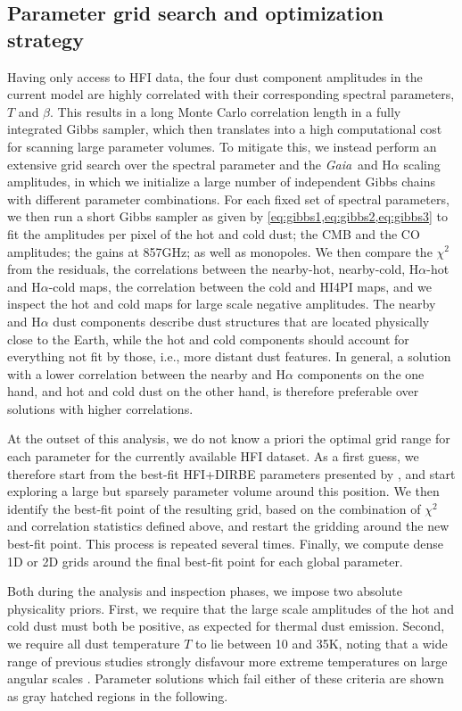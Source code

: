 \documentclass{aa}
\def\Gaia{\textit{Gaia}}
\def\Ha{H$\alpha$}
\def\,{\thinspace}
\begin{document}
\subsection{Parameter grid search and optimization strategy}
\label{sec:statistics}
Having only access to HFI data, the four dust component amplitudes in the current model are highly correlated with their corresponding spectral parameters, $T$ and $\beta$. This results in a long Monte Carlo correlation length in a fully integrated Gibbs sampler, which then translates into a high computational cost for scanning large parameter volumes. To mitigate this, we instead perform an extensive grid search over the spectral parameter and the \Gaia\ and H$\alpha$ scaling amplitudes, in which we initialize a large number of independent Gibbs chains with different parameter combinations. For each fixed set of spectral parameters, we then run a short Gibbs sampler as given by \cref{eq:gibbs1,eq:gibbs2,eq:gibbs3} to fit the amplitudes per pixel of the hot and cold dust; the CMB and the CO amplitudes; the gains at 857\,GHz; as well as monopoles. We then compare the $\chi^2$ from the residuals, the correlations between the nearby-hot, nearby-cold, \Ha-hot and \Ha-cold maps, the correlation between the cold and HI4PI maps, and we inspect the hot and cold maps for large scale negative amplitudes. The nearby and H$\alpha$ dust components describe dust structures that are located physically close to the Earth, while the hot and cold components should account for everything not fit by those, i.e., more distant dust features. In general, a solution with a lower correlation between the nearby and H$\alpha$ components on the one hand, and hot and cold dust on the other hand, is therefore preferable over solutions with higher correlations. 

At the outset of this analysis, we do not know a priori the optimal grid range for each parameter for the currently available HFI dataset. As a first guess, we therefore start from the best-fit HFI+DIRBE parameters presented by \citet{CG02_05}, and start exploring a large but sparsely parameter volume around this position. We then identify the best-fit point of the resulting grid, based on the combination of $\chi^2$ and correlation statistics defined above, and restart the gridding around the new best-fit point. This process is repeated several times. Finally, we compute dense 1D or 2D grids around the final best-fit point for each global parameter. 

Both during the analysis and inspection phases, we impose two absolute physicality priors. First, we require that the large scale amplitudes of the hot and cold dust must both be positive, as expected for thermal dust emission. Second, we require all dust temperature $T$ to lie between 10 and 35\,K, noting that a wide range of previous studies strongly disfavour more extreme temperatures on large angular scales \citep{2017A&A_DustParam,2016SAA_DustReview,Hensley2021}. Parameter solutions which fail either of these criteria are shown as gray hatched regions in the following.
\end{document}
